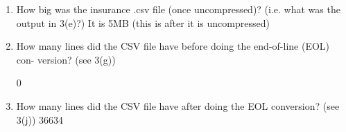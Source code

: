 \documentclass[12pt]{article}
\theoremstyle{definition}
\begin{document}
\begin{enumerate}
    \item How big was the insurance .csv file (once uncompressed)? (i.e. what was the output in 3(e)?)
   It is  5MB (this is after it is uncompressed)
\item How many lines did the CSV file have before doing the end-of-line (EOL) con- version? (see 3(g))

0

\item How many lines did the CSV file have after doing the EOL conversion? (see 3(j))
36634
\end{enumerate}
 
\end{document}
